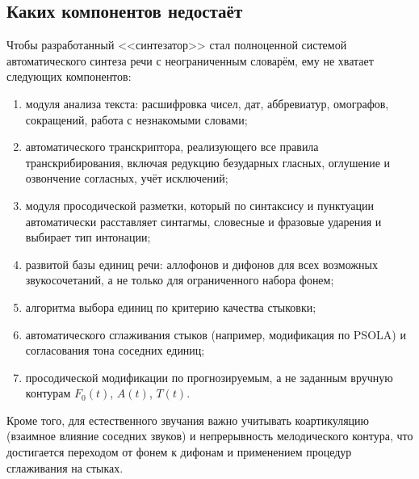 \subsection{Каких компонентов недостаёт}

Чтобы разработанный <<синтезатор>> стал полноценной системой
автоматического синтеза речи с неограниченным словарём, ему не хватает
следующих компонентов:
\begin{enumerate}
	\item модуля анализа текста: расшифровка чисел, дат, аббревиатур,
	омографов, сокращений, работа с незнакомыми словами;
	\item автоматического транскриптора, реализующего все правила
	транскрибирования, включая редукцию безударных гласных, оглушение и
	озвончение согласных, учёт исключений;
	\item модуля просодической разметки, который по синтаксису и пунктуации
	автоматически расставляет синтагмы, словесные и фразовые ударения и
	выбирает тип интонации;
	\item развитой базы единиц речи: аллофонов и дифонов для всех возможных
	звукосочетаний, а не только для ограниченного набора фонем;
	\item алгоритма выбора единиц по критерию качества стыковки;
	\item автоматического сглаживания стыков (например, модификация по
	PSOLA) и согласования тона соседних единиц;
	\item просодической модификации по прогнозируемым, а не заданным
	вручную контурам $F_0(t)$, $A(t)$, $T(t)$.
\end{enumerate}
Кроме того, для естественного звучания важно учитывать коартикуляцию
(взаимное влияние соседних звуков) и непрерывность мелодического контура,
что достигается переходом от фонем к дифонам и применением процедур
сглаживания на стыках.
